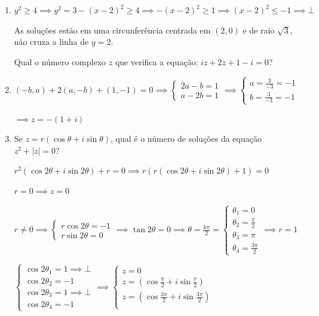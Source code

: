 \documentclass[12pt, openright, a4paper, twoside, english, brazil]{article}
\newenvironment{qitem}{
  \color{black}
\item}{\vspace{10pt}}
\newcommand{\cis}[1]{\displaystyle(\cos#1+i\sin#1)}
\begin{document}
\begin{enumerate}[\bfseries 1.]
\begin{qitem}
  $y^2\ge 4\implies y^2=3-(x-2)^2\ge 4\implies -(x-2)^2\ge 1\implies
  (x-2)^2\le -1\implies \bot$

  As soluções estão em uma circunferência centrada em $(2,0)$ e de
  raio $\sqrt3$, não cruza a linha de $y=2$.

\end{qitem}

Qual o número complexo $z$ que verifica a equação: $iz+2\overline z+1-i=0$?

\begin{qitem} %
  \color{red}
  $(-b,a)+2(a,-b)+(1,-1)=0\implies
  \begin{cases}2a-b=1\\a-2b=1
  \end{cases}\implies
  \begin{cases}a = \frac{3}{-3}=-1\\b=\frac{3}{-3}=-1
  \end{cases}$

  $\implies z=-(1+i)$
\end{qitem}

\begin{qitem} %
  Se $z=r\cis\theta$, qual é o número de soluções da equação $z^2+|z|=0$?

  \color{red}
  $r^2\cis{2\theta}+r=0\implies r(r\cis{2\theta}+1)=0$

  $r=0\implies z=0$

  $r\ne0\implies
  \begin{cases}r\cos{2\theta}=-1\\r\sin{2\theta}=0
  \end{cases}\implies \tan{2\theta}=0\implies \theta=\frac{k\pi}{2}=
  \begin{cases}\theta_1=0\\\theta_2=\frac{\pi}{2}\\\theta_3=\pi\\\theta_4=\frac{3\pi}{2}
  \end{cases}\implies r=1$

  $
  \begin{cases}
    \cos{2\theta_1}=1\implies \bot\\
    \cos{2\theta_2}=-1\\
    \cos{2\theta_3}=1\implies \bot\\
    \cos{2\theta_4}=-1
  \end{cases}\implies
  \begin{cases}
    z=0\\
    z=\cis{\frac{\pi}{2}}\\
    z=\cis{\frac{3\pi}{2}}\\
  \end{cases}$
\end{qitem}


\end{enumerate}
\end{document}
